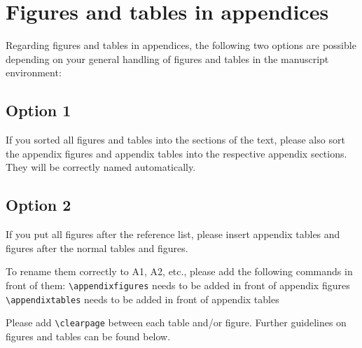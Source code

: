 \documentclass[gmd, manuscript]{copernicus}
\begin{document}



\appendix
\section{Figures and tables in appendices}

Regarding figures and tables in appendices, the following two options
are possible depending on your general handling of figures and tables in
the manuscript environment:

\subsection{Option 1}

If you sorted all figures and tables into the sections of the text,
please also sort the appendix figures and appendix tables into the
respective appendix sections. They will be correctly named
automatically.

\subsection{Option 2}

If you put all figures after the reference list, please insert appendix
tables and figures after the normal tables and figures.

To rename them correctly to A1, A2, etc., please add the following
commands in front of them: \texttt{\textbackslash{}appendixfigures}
needs to be added in front of appendix figures
\texttt{\textbackslash{}appendixtables} needs to be added in front of
appendix tables

Please add \texttt{\textbackslash{}clearpage} between each table and/or
figure. Further guidelines on figures and tables can be found below.
\noappendix


\end{document}
